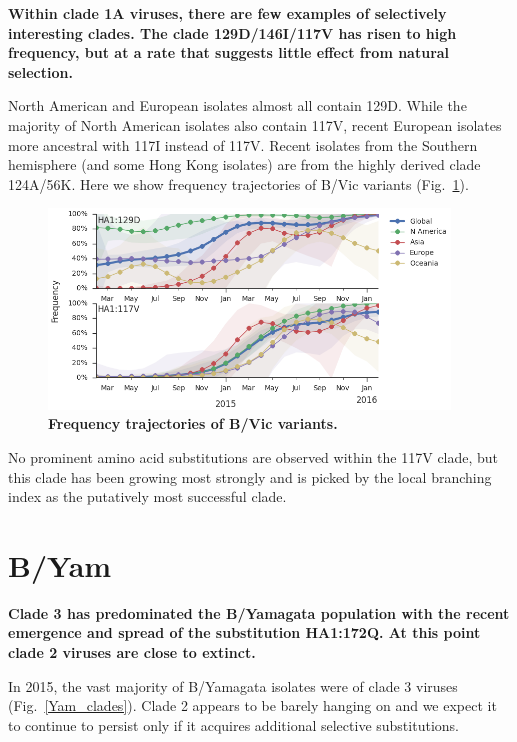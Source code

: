 \documentclass[11pt,oneside,letterpaper]{article}
\begin{document}
\textbf{Within clade 1A viruses, there are few examples of selectively interesting clades. The clade 129D/146I/117V has risen to high frequency, but at a rate that suggests little effect from natural selection.}

North American and European isolates almost all contain 129D. While the majority of North American isolates also contain 117V, recent European isolates more ancestral with 117I instead of 117V. Recent isolates from the Southern hemisphere (and some Hong Kong isolates) are from the highly derived clade 124A/56K. Here we show frequency trajectories of B/Vic variants (Fig.\ \ref{Vic_mutations}).

\begin{figure}[h!]
	\centering		
	\includegraphics[width=0.95\textwidth]{../figures/feb-2016/Vic_mutations.png}
	\caption{\textbf{Frequency trajectories of B/Vic variants.} 
	}
	\label{Vic_mutations}
\end{figure}

No prominent amino acid substitutions are observed within the 117V clade, but this clade has been growing most strongly and is picked by the local branching index \cite{neher2014predicting} as the putatively most successful clade.

\clearpage
\pagebreak

\section*{B/Yam}

\textbf{Clade 3 has predominated the B/Yamagata population with the recent emergence and spread of the substitution HA1:172Q. At this point clade 2 viruses are close to extinct.}

In 2015, the vast majority of B/Yamagata isolates were of clade 3 viruses (Fig.\ \ref{Yam_clades}). Clade 2 appears to be barely hanging on and we expect it to continue to persist only if it acquires additional selective substitutions.
\end{document}
